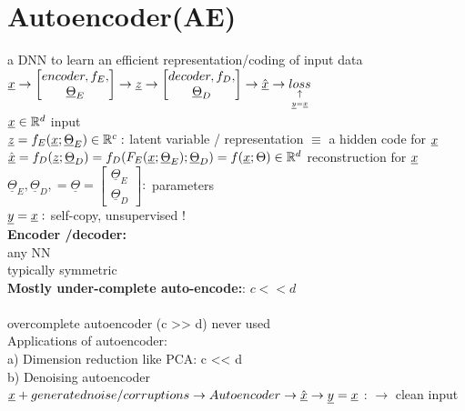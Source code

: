\section{Autoencoder(AE)}
a DNN to learn an efficient representation/coding of input data\\
$ {\underline x} \rightarrow  \left[\begin{matrix}
encoder, f_E , \\
\underline{\Theta}_E
\end{matrix} \right] \rightarrow {\underline z} \rightarrow \left[ \begin{matrix}
decoder, f_D ,\\
 \underline{\Theta}_D
\end{matrix}\right] \rightarrow \hat{{\underline x}} \rightarrow \underset{\underset{{\underline y} = {\underline x}}{\uparrow} }{loss}$\\
$  {\underline x} \in \mathbb R ^d  $ input \\
$  {\underline z} = f_E ({\underline x} ; \underline{\Theta}_E) \in \mathbb R^c : $ latent variable / representation $  \equiv  $ a hidden code for $ {\underline x}  $\\
 $ \hat{{\underline x}} = f_D ({\underline z} ; \underline{\Theta}_D )= f_D (F_E ({\underline x} ; \underline{\Theta}_E ) ; \underline{\Theta}_D )  = f({\underline x} ; \Theta ) \in \mathbb R ^d  $ reconstruction for $  {\underline x}  $\\
 $  \underline{\Theta} _E ,   \underline{\Theta} _D , = \underline{\Theta} = \left[ \begin{matrix}
 \underline{\Theta} _E \\
 \underline{\Theta} _D 
 \end{matrix}  \right] : $ parameters \\
 $  {\underline y} = {\underline x}:  $ self-copy, unsupervised ! \\
\textbf{ Encoder /decoder:}\\
\textbullet any NN \\
\textbullet typically symmetric \\
\textbf{Mostly under-complete auto-encode:}: $ c << d  $\\
 \\
overcomplete autoencoder (c >> d) never used \\
Applications of autoencoder:\\
\textbullet a) Dimension reduction like PCA: c << d \\
\textbullet b) Denoising autoencoder \\
$ {\underline x} + generated noise / corruptions \rightarrow Autoencoder \rightarrow \hat{{\underline x}}\rightarrow {\underline y} = {\underline x}  $ : $ \rightarrow $ clean input \\
